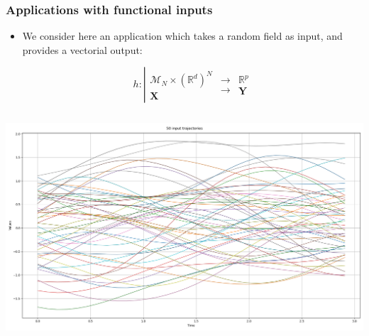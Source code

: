 \documentclass[aspectratio=169]{beamer}
\begin{document}


\begin{frame}[containsverbatim]
\frametitle{Applications with functional inputs}

\begin{itemize}
\item We consider here an application which takes a random field as input, and provides a vectorial output: 

\scriptsize
    \begin{equation*}
h:\left| \begin{array}{c}  \mathcal{M}_N \times (\mathbb{R}^d)^N \\ \mathbf{X} \end{array} \begin{array}{c} \rightarrow \\ \rightarrow  \end{array} \begin{array}{c} \mathbb{R}^p \\ \mathbf{Y} \end{array} \right. 
\end{equation*}

\end{itemize}

  \begin{columns}
\centering
    \includegraphics[width=.85\textwidth]{figures/Trajs.png}


\end{columns}
\end{frame}
\end{document}
